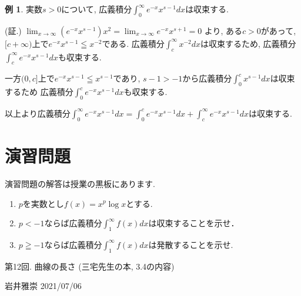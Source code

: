 \documentclass[dvipdfmx,a4paper,11pt]{article}
\theoremstyle{definition}
\newtheorem{exa}[thm]{例}
\begin{document}
  \begin{exa}
実数$s>0$について, 広義積分$\int_{0}^{\infty} e^{-x}x^{s-1}dx $は収束する.

\hspace{-18pt}(証.)
$\lim_{x \rightarrow \infty} (e^{-x}x^{s-1}) x^{2} = \lim_{x \rightarrow \infty} e^{-x}x^{s+1} =0$
より, ある$c>0$があって, $[c +\infty)$上で$e^{-x} x^{s-1} \leqq x^{-2}$である.
広義積分$\int_{c}^{\infty} x^{-2} dx$は収束するため, 広義積分$\int_{c}^{\infty}e^{-x} x^{s-1}dx$も収束する.

一方$(0 , c]$上で$e^{-x}x^{s-1} \leqq x^{s-1}$であり, $s-1 > -1$から広義積分$\int_{0}^{c} x^{s-1} dx$は収束するため
広義積分$\int_{0}^{c} e^{-x}x^{s-1} dx$も収束する.

以上より広義積分$\int_{0}^{\infty} e^{-x}x^{s-1}dx  =\int_{0}^{c} e^{-x}x^{s-1}dx +\int_{c}^{\infty} e^{-x}x^{s-1}dx  $は収束する.
 \end{exa}



\section{演習問題}
演習問題の解答は授業の黒板にあります.
\begin{enumerate}
\item[] $p$を実数とし$f(x) = x^p \log x$とする.
\item $p< -1$ならば広義積分$\int_{1}^{\infty} f(x) dx$は収束することを示せ．
\item $p\geqq -1$ならば広義積分$\int_{1}^{\infty} f(x) dx$は発散することを示せ.
\end{enumerate}



\newpage

\begin{center}
{\Large 第12回. 曲線の長さ (三宅先生の本, 3.4の内容)}
\end{center}

\begin{flushright}
 岩井雅崇 2021/07/06
\end{flushright}
\end{document}
